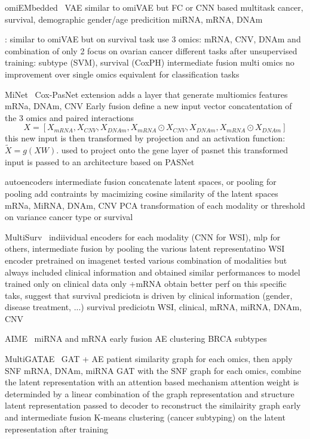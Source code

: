 \documentclass[../main.tex]{subfiles}
\begin{document}
		omiEMbedded~\cite{Zhang2021} VAE similar to omiVAE but FC or CNN based
		multitask cancer, survival, demographic gender/age predicition
		miRNA, mRNA, DNAm

		\cite{Hira2021}: similar to omiVAE but on survival task
		use 3 omics: mRNA, CNV, DNAm and combination of only 2
		focus on ovarian cancer
		different tasks after unsupervised training: subtype (SVM), survival (CoxPH)
		intermediate fusion
		multi omics no improvement over single omics equivalent for classification tasks

		MiNet~\cite{Hao2019} Cox-PasNet extension
		adds a layer that generate multiomics features
		mRNa, DNAm, CNV
		Early fusion define a new input vector concatentation of the 3 omics and paired interactions
		\begin{equation}
			X = \left[X_{mRNA}, X_{CNV}, X_{DNAm}, X_{mRNA}\odot X_{CNV}, X_{DNAm}, X_{mRNA}\odot X_{DNAm} \right]
		\end{equation}
		this new input is then transformed by projection and an activation function: \(\tilde{X} = g\left(XW\right)\).
		used to project onto the gene layer of pasnet
		this transformed input is passed to an architecture based on PASNet

		\cite{Tong2021} autoencoders intermediate fusion
		concatenate latent spaces, or pooling
		for pooling add contraints by macimizing cosine similarity of the latent spaces
		mRNa, MiRNA, DNAm, CNV
		PCA transformation of each modality or threshold on variance
		cancer type or survival

		MultiSurv~\cite{MultiSurv} indiividual encoders for each modality (CNN for WSI), mlp for others,
		intermediate fusion by pooling the various latent representatino
		WSI encoder pretrained on imagenet
		tested various combination of modalities but always  included clinical information and obtained similar performances to model trained only on clinical data only +mRNA obtain better perf on this specific taks, suggest that survival prediciotn is driven by clinical information (gender, disease treatment, ...)
		survival prediciotn
		WSI, clinical, mRNA, miRNA, DNAm, CNV

		AIME~\cite{Yu2022} miRNA and mRNA early fusion AE
		clustering BRCA subtypes

		MultiGATAE~\cite{MultiGATAE} GAT + AE
		patient similarity graph for each omics, then apply SNF
		mRNA, DNAm, miRNA
		GAT with the SNF graph for each omics, combine the latent representation with an attention based mechanism
		attention weight is determinded by a linear combination of the graph representation and structure
		latent representation passed to decoder to reconstruct the similairity graph
		early and intermediate fusion
		K-means clustering (cancer subtyping) on the latent representation after training
\end{document}
